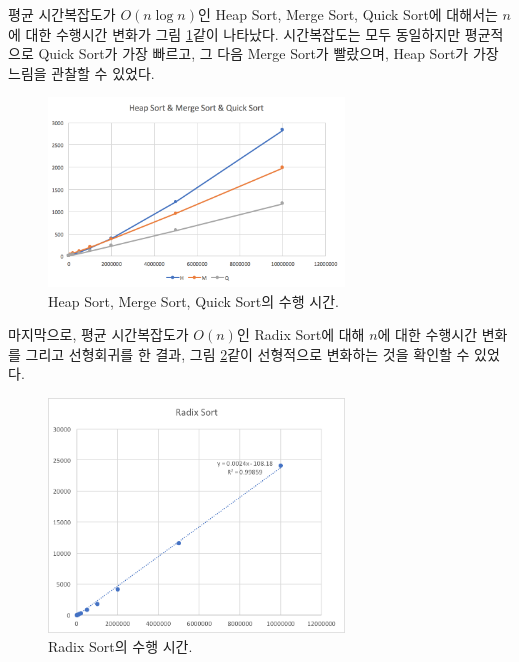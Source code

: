 \documentclass{article}
\begin{document}
	\vfill
	평균 시간복잡도가 $ O(n\log{n}) $인 Heap Sort, Merge Sort, Quick Sort에
	대해서는 $ n $에 대한 수행시간 변화가 그림 \ref{fig:hmq}\와 같이 나타났다.
	시간복잡도는 모두 동일하지만 평균적으로 Quick Sort가 가장 빠르고,
	그 다음 Merge Sort가 빨랐으며, Heap Sort가 가장 느림을 관찰할 수 있었다.
	\begin{figure}[h]
		\centering
		\includegraphics[width=0.7\textwidth]{HMQ.png}
		\caption{Heap Sort, Merge Sort, Quick Sort의 수행 시간.}
		\label{fig:hmq}
	\end{figure}
	\vfill

	\clearpage
	
	마지막으로, 평균 시간복잡도가 $ O(n) $인 Radix Sort에 대해
	$ n $에 대한 수행시간 변화를 그리고
	선형회귀를 한 결과, 그림 \ref{fig:radix}\와 같이
	선형적으로 변화하는 것을 확인할 수 있었다.
	\begin{figure}[h]
		\centering
		\includegraphics[width=0.7\textwidth]{R.png}
		\caption{Radix Sort의 수행 시간.}
		\label{fig:radix}
	\end{figure}
\end{document}
